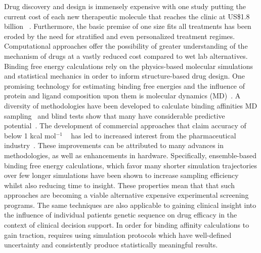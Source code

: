 
Drug discovery and design is immensely expensive with one study putting the current 
cost of each new therapeutic molecule that reaches the clinic at US\$1.8 billion 
~\cite{Paul2010}.
Furthermore, the basic premise of one size fits all treatments has been eroded by the 
need for stratified and even personalized treatment regimes.
Computational approaches offer the possibility of greater understanding of the 
mechanism of drugs at a vastly reduced cost compared to wet lab alternatives.
Binding free energy calculations rely on the physics-based molecular simulations 
and statistical mechanics in order to inform structure-based drug design. 
One promising technology for
estimating binding free energies and the influence of protein and ligand
composition upon them is molecular dynamics (MD)~\cite{Karplus2005}. 
A diversity of methodologies have been developed to calculate binding affinities
MD sampling~\cite{Mobley2012} and blind tests show that many have considerable
predictive potential~\cite{Mey2017, Yin2017}.
The development of commercial approaches that claim accuracy of below 1 
kcal mol$^{-1}$ ~\cite{Wang2015} has led to increased interest from the 
pharmaceutical industry~\cite{Ganesan2017}.
These improvements can be attributed to many advances in methodologies, as well 
as enhancements in hardware. 
Specifically, ensemble-based  binding free energy calculations, which favor many 
shorter simulation trajectories over few longer simulations have been shown to 
increase sampling efficiency whilst also reducing time to insight.
These properties mean that that such approaches are becoming a viable alternative 
expensive experimental screening programs. 
The same techniques are also applicable to gaining clinical insight into the 
influence of individual patients genetic sequence on drug efficacy in the context 
of clinical decision support. 
In order for binding affinity calculations to gain traction, requires using 
simulation protocols which have well-defined uncertainty and consistently 
produce statistically meaningful results.

